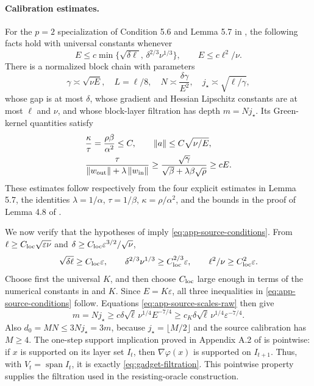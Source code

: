 \documentclass[11pt]{article}
\theoremstyle{remark}
\theoremstyle{remark}
\newcommand{\eps}{\varepsilon}
\newcommand{\norm}[1]{\left\lVert#1\right\rVert}
\begin{document}
\paragraph{Calibration estimates.}
For the $p=2$ specialization of Condition 5.6 and Lemma 5.7 in
\cite{zhou}, the following facts hold with universal constants whenever
\begin{equation}
 E\le c\min\{\sqrt{\delta\ell},\,\delta^{2/3}\nu^{1/3}\},
 \qquad E\le c\ell^2/\nu.                  \label{eq:app-source-conditions}
\end{equation}
There is a normalized block chain with parameters
\begin{equation}
 \gamma\asymp\sqrt{\nu E},\quad L=\ell/8,
 \quad N\asymp \frac{\delta\gamma}{E^2},
 \quad j_\star\asymp\sqrt{\ell/\gamma},   \label{eq:app-source-scales-raw}
\end{equation}
whose gap is at most $\delta$, whose gradient and Hessian Lipschitz
constants are at most $\ell$ and $\nu$, and whose block-layer filtration
has depth $m=Nj_\star$.  Its Green-kernel quantities satisfy
\begin{align}
 &\frac{\kappa}{\tau}=\frac{\rho\beta}{\alpha^2}\le C,\qquad
 \norm a\le C\sqrt{\nu/E},                                      \label{eq:app-source-a}\\
 &\frac{\tau}{\norm{w_{\rm out}}+\lambda\norm{w_{\rm in}}}
 \ge \frac{\sqrt\gamma}{\sqrt\beta+\lambda\beta\sqrt\rho}
 \ge cE.                                                         \label{eq:app-source-cert}
\end{align}
These estimates follow respectively from the four
explicit estimates in Lemma 5.7, the identities
$\lambda=1/\alpha$, $\tau=1/\beta$, $\kappa=\rho/\alpha^2$, and the
bounds in the proof of Lemma 4.8 of \cite{zhou}.

We now verify that the hypotheses of  imply
\eqref{eq:app-source-conditions}.  From
$\ell\ge C_{\rm loc}\sqrt{\eps\nu}$ and
$\delta\ge C_{\rm loc}\eps^{3/2}/\sqrt\nu$,
\[
 \sqrt{\delta\ell}\ge C_{\rm loc}\eps,
 \qquad \delta^{2/3}\nu^{1/3}\ge C_{\rm loc}^{2/3}\eps,
 \qquad \ell^2/\nu\ge C_{\rm loc}^2\eps.
\]
Choose first the universal $K$, and then choose $C_{\rm loc}$ large enough in
terms of the numerical constants in \cite{zhou} and $K$.  Since
$E=K\eps$, all three inequalities in
\eqref{eq:app-source-conditions} follow.  Equations
\eqref{eq:app-source-scales-raw} then give
\begin{equation}
 m=Nj_\star
 \ge c\delta\sqrt\ell\,\nu^{1/4}E^{-7/4}
 \ge c_K\delta\sqrt\ell\,\nu^{1/4}\eps^{-7/4}.                 \label{eq:app-depth}
\end{equation}
Also $d_0=MN\le3Nj_\star=3m$, because
$j_\star=\lfloor M/2\rfloor$ and the source calibration has $M\ge4$.
The one-step support implication proved in Appendix A.2 of \cite{zhou}
is pointwise: if $x$ is supported on its layer set $I_t$, then
$\nabla\varphi(x)$ is supported on $I_{t+1}$.  Thus, with
$V_t=\operatorname{span}I_t$, it is exactly
\eqref{eq:gadget-filtration}. This pointwise property supplies the
filtration used in the resisting-oracle construction.
\end{document}

